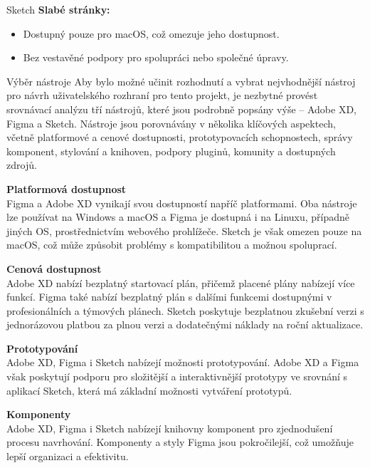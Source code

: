 \begin{subsection}{Sketch}
    \textbf{Slabé stránky:}
    \begin{itemize}
        \item Dostupný pouze pro macOS, což omezuje jeho dostupnost.
        \item Bez vestavěné podpory pro spolupráci nebo společné úpravy\cite{w_industry_the_ultimate_battle_figma_vs_sketch_vs_adobe_xd, sketch}.
    \end{itemize}
\end{subsection}

\begin{subsection}{Výběr nástroje}
    \label{subsec:navrh-ui-nastroje-vyber}
    Aby bylo možné učinit rozhodnutí a vybrat nejvhodnější nástroj pro návrh uživatelského rozhraní pro tento projekt, je nezbytné provést srovnávací analýzu tří nástrojů, které jsou podrobně popsány výše – Adobe XD, Figma a Sketch.
    Nástroje jsou porovnávány v několika klíčových aspektech, včetně platformové a cenové dostupnosti, prototypovacích schopnostech, správy komponent, stylování a knihoven, podpory pluginů, komunity a dostupných zdrojů.

    \pagebreak
    \textbf{Platformová dostupnost}\\
    Figma a Adobe XD vynikají svou dostupností napříč platformami.
    Oba nástroje lze používat na Windows a macOS a Figma je dostupná i na Linuxu, případně jiných OS, prostřednictvím webového prohlížeče.
    Sketch je však omezen pouze na macOS, což může způsobit problémy s kompatibilitou a možnou spoluprací.

    \textbf{Cenová dostupnost}\\
    Adobe XD nabízí bezplatný startovací plán, přičemž placené plány nabízejí více funkcí.
    Figma také nabízí bezplatný plán s dalšími funkcemi dostupnými v profesionálních a týmových plánech.
    Sketch poskytuje bezplatnou zkušební verzi s jednorázovou platbou za plnou verzi a dodatečnými náklady na roční aktualizace.

    \textbf{Prototypování}\\
    Adobe XD, Figma i Sketch nabízejí možnosti prototypování.
    Adobe XD a Figma však poskytují podporu pro složitější a interaktivnější prototypy ve srovnání s aplikací Sketch, která má základní možnosti vytváření prototypů.

    \textbf{Komponenty}\\
    Adobe XD, Figma i Sketch nabízejí knihovny komponent pro zjednodušení procesu navrhování.
    Komponenty a styly Figma jsou pokročilejší, což umožňuje lepší organizaci a efektivitu.


\end{subsection}
